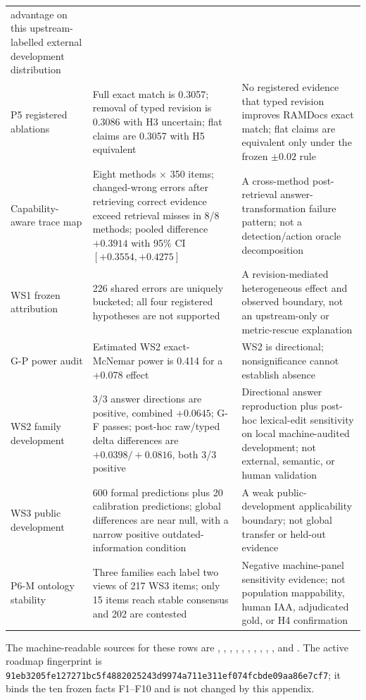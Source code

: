 \begin{table}[h]
\begin{center}
\begin{tabular}{p{}p{}p{}}
advantage on this upstream-labelled external development distribution \\
P5 registered ablations & Full exact match is 0.3057; removal of typed revision
is 0.3086 with H3 uncertain; flat claims are 0.3057 with H5 equivalent & No
registered evidence that typed revision improves RAMDocs exact match; flat
claims are equivalent only under the frozen $\pm0.02$ rule \\
Capability-aware trace map & Eight methods $\times$ 350 items; changed-wrong
errors after retrieving correct evidence exceed retrieval misses in 8/8 methods;
pooled difference $+0.3914$ with 95\% CI $[+0.3554,+0.4275]$ & A cross-method
post-retrieval answer-transformation failure pattern; not a detection/action
oracle decomposition \\
WS1 frozen attribution & 226 shared errors are uniquely bucketed; all four
registered hypotheses are not supported & A revision-mediated heterogeneous
effect and observed boundary, not an upstream-only or metric-rescue explanation \\
G-P power audit & Estimated WS2 exact-McNemar power is 0.414 for a +0.078 effect
& WS2 is directional; nonsignificance cannot establish absence \\
WS2 family development & 3/3 answer directions are positive, combined $+0.0645$;
G-F passes; post-hoc raw/typed delta differences are $+0.0398/+0.0816$, both
3/3 positive & Directional answer reproduction plus post-hoc lexical-edit
sensitivity on local machine-audited development; not external, semantic, or human validation \\
WS3 public development & 600 formal predictions plus 20 calibration predictions;
global differences are near null, with a narrow positive outdated-information
condition & A weak public-development applicability boundary; not global transfer
or held-out evidence \\
P6-M ontology stability & Three families each label two views of 217 WS3 items;
only 15 items reach stable consensus and 202 are contested & Negative
machine-panel sensitivity evidence; not population mappability, human IAA,
adjudicated gold, or H4 confirmation \\
\bottomrule
\end{tabular}
\end{center}
\end{table}

The machine-readable sources for these rows are
,
,
,
,
,
,
,
,
,
, and
. The active roadmap fingerprint is
\texttt{91eb3205fe127271bc5f4882025243d9974a711e311ef074fcbde09aa86e7cf7};
it binds the ten frozen facts F1--F10 and is not changed by this appendix.

